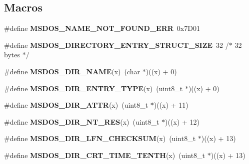 \subsection*{Macros}
\begin{DoxyCompactItemize}
\item 
\mbox{\label{group__libfs__msdos_gaad37026ea110bd32b58085551a0de997}} 
\#define {\bfseries M\+S\+D\+O\+S\+\_\+\+N\+A\+M\+E\+\_\+\+N\+O\+T\+\_\+\+F\+O\+U\+N\+D\+\_\+\+E\+RR}~0x7\+D01
\item 
\mbox{\label{group__libfs__msdos_ga70086e6aa2f55d1041bc7a4e2433f44e}} 
\#define {\bfseries M\+S\+D\+O\+S\+\_\+\+D\+I\+R\+E\+C\+T\+O\+R\+Y\+\_\+\+E\+N\+T\+R\+Y\+\_\+\+S\+T\+R\+U\+C\+T\+\_\+\+S\+I\+ZE}~32 /$\ast$ 32 bytes $\ast$/
\item 
\mbox{\label{group__libfs__msdos_ga5cff2b06372e5317de15ce5e8ad8ff07}} 
\#define {\bfseries M\+S\+D\+O\+S\+\_\+\+D\+I\+R\+\_\+\+N\+A\+ME}(x)~(char     $\ast$)((x) + 0)
\item 
\mbox{\label{group__libfs__msdos_ga9afb6cb315d9208ea1e5c3c140616a77}} 
\#define {\bfseries M\+S\+D\+O\+S\+\_\+\+D\+I\+R\+\_\+\+E\+N\+T\+R\+Y\+\_\+\+T\+Y\+PE}(x)~(uint8\+\_\+t  $\ast$)((x) + 0)
\item 
\mbox{\label{group__libfs__msdos_ga8b6a38b5143168086a77d185ebbc9b10}} 
\#define {\bfseries M\+S\+D\+O\+S\+\_\+\+D\+I\+R\+\_\+\+A\+T\+TR}(x)~(uint8\+\_\+t  $\ast$)((x) + 11)
\item 
\mbox{\label{group__libfs__msdos_ga71393649e9d2b5d5ed7862036c23ec70}} 
\#define {\bfseries M\+S\+D\+O\+S\+\_\+\+D\+I\+R\+\_\+\+N\+T\+\_\+\+R\+ES}(x)~(uint8\+\_\+t  $\ast$)((x) + 12)
\item 
\mbox{\label{group__libfs__msdos_gad8c658c6a3c0d6429b959a9d5587ac2d}} 
\#define {\bfseries M\+S\+D\+O\+S\+\_\+\+D\+I\+R\+\_\+\+L\+F\+N\+\_\+\+C\+H\+E\+C\+K\+S\+UM}(x)~(uint8\+\_\+t  $\ast$)((x) + 13)
\item 
\mbox{\label{group__libfs__msdos_ga467f2394b4e036389f898fe1ff9fb530}} 
\#define {\bfseries M\+S\+D\+O\+S\+\_\+\+D\+I\+R\+\_\+\+C\+R\+T\+\_\+\+T\+I\+M\+E\+\_\+\+T\+E\+N\+TH}(x)~(uint8\+\_\+t  $\ast$)((x) + 13)

\end{DoxyCompactItemize}
